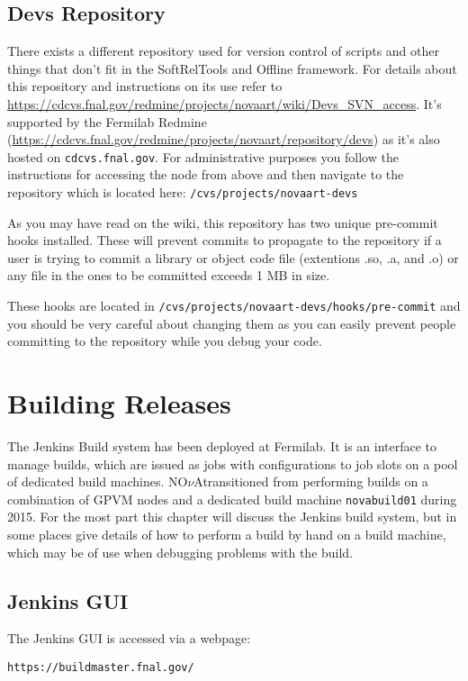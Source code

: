 \documentclass[letterpaper,10pt]{article}
\newcommand{\nova}{NO$\nu$A}
\newcommand{\novas}{\nova \space}
\begin{document}
\subsection{Devs Repository}
There exists a different repository used for version control of scripts and other things that don't fit in the SoftRelTools and Offline framework. For details about this repository and instructions on its use refer to \url{https://cdcvs.fnal.gov/redmine/projects/novaart/wiki/Devs_SVN_access}. It's supported by the Fermilab Redmine (\url{https://cdcvs.fnal.gov/redmine/projects/novaart/repository/devs}) as it's also hosted on \verb|cdcvs.fnal.gov|. For administrative purposes you follow the instructions for accessing the node from above and then navigate to the repository which is located here: \verb|/cvs/projects/novaart-devs|

As you may have read on the wiki, this repository has two unique pre-commit hooks installed. These will prevent commits to propagate to the repository if a user is trying to commit a library or object code file (extentions .so, .a, and .o) or any file in the ones to be committed exceeds 1 MB in size.

These hooks are located in \verb|/cvs/projects/novaart-devs/hooks/pre-commit| and you should be very careful about changing them as you can easily prevent people committing to the repository while you debug your code.

\section{Building Releases}
The Jenkins Build system has been deployed at Fermilab. It is an interface to manage builds, which are issued as jobs with configurations to job slots on a pool of dedicated build machines. \novas transitioned from performing builds on a combination of GPVM nodes and a dedicated build machine \verb|novabuild01| during 2015. For the most part this chapter will discuss the Jenkins build system, but in some places give details of how to perform a build by hand on a build machine, which may be of use when debugging problems with the build.

\subsection{Jenkins GUI}
The Jenkins GUI is accessed via a webpage:
\begin{verbatim}
https://buildmaster.fnal.gov/
\end{verbatim}
\end{document}
